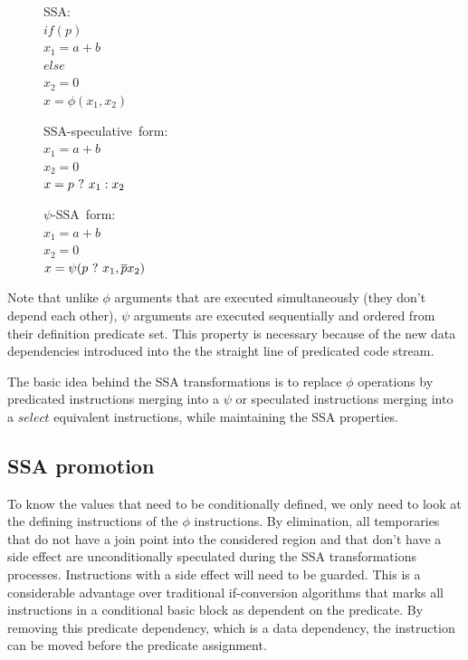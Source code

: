\begin{figure}
\begin{minipage}[t]{3.5cm}
\mbox{SSA:} \\
$ if (p) $ \\
$   x_1 = a+b $ \\
$ else $ \\
$   x_2 = 0 $ \\
$ x = \phi (x_1, x_2) $ \\
\end{minipage}
\begin{minipage}[t]{3.5cm}
\mbox{SSA-speculative form:} \\
$x_1 = a + b $ \\
$x_2 = 0 $ \\
$x = p ~?~  x_1 : x_2$ \\
\end{minipage}
\begin{minipage}[t]{3.5cm}
\mbox{$\psi$-SSA form:} \\
$x_1 = a + b $ \\
$x_2 = 0 $\\
$x = \psi (p ~?~ x_1, \overline{p} x_2) $ \\
\end{minipage}
\end{figure}

Note that unlike $\phi$ arguments that are executed simultaneously (they don't depend each other), $\psi$ arguments are executed sequentially and ordered from their definition predicate set. This property is necessary because of the new data dependencies introduced into the the straight line of predicated code stream.

The basic idea behind the SSA transformations is to replace $\phi$ operations by predicated instructions merging into a $\psi$ or speculated instructions merging into a $select$ equivalent instructions, while maintaining the SSA properties.

\subsection{SSA promotion}

To know the values that need to be conditionally defined, we only need to look at the defining instructions of the $\phi$ instructions. By elimination, all temporaries that do not have a join point into the considered region and that don't have a side effect are unconditionally speculated during the SSA transformations processes. Instructions with a side effect will need to be guarded. This is a considerable advantage over traditional if-conversion algorithms that marks all instructions in a conditional basic block as dependent on the predicate. By removing this predicate dependency, which is a data dependency, the instruction can be moved before the predicate assignment.


